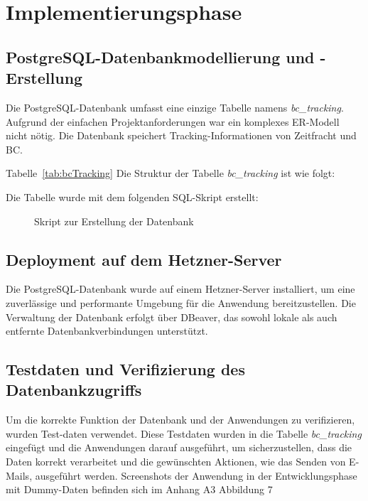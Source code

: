 \section{Implementierungsphase} 
\label{sec:Implementierungsphase}

\subsection{PostgreSQL-Datenbankmodellierung und -Erstellung}
\label{sec:Datenbankmodellierung}

Die PostgreSQL-Datenbank umfasst eine einzige Tabelle namens \textit{bc\_tracking}. 
Aufgrund der einfachen Projektanforderungen war ein komplexes ER-Modell nicht nötig. 
Die Datenbank speichert Tracking-Informationen von Zeitfracht und BC.

Tabelle~\ref{tab:bcTracking} Die Struktur der Tabelle \textit{bc\_tracking} ist wie folgt:
\\

\clearpage

Die Tabelle wurde mit dem folgenden SQL-Skript erstellt:

\begin{figure}[htb]
    \centering
    \caption{Skript zur Erstellung der Datenbank}
    \label{fig:DatenbankBCTracking}
\end{figure}



\subsection{Deployment auf dem Hetzner-Server}
\label{sec:Hetzner-Server}

Die PostgreSQL-Datenbank wurde auf einem Hetzner-Server installiert, um eine zuverlässige und performante 
Umgebung für die Anwendung bereitzustellen. Die Verwaltung der Datenbank erfolgt über DBeaver, das sowohl 
lokale als auch entfernte Datenbankverbindungen unterstützt.

\subsection{Testdaten und Verifizierung des Datenbankzugriffs}
\label{sec:VerifizierungTestdaten}

Um die korrekte Funktion der Datenbank und der Anwendungen zu verifizieren, wurden Test-daten verwendet. 
Diese Testdaten wurden in die Tabelle \textit{bc\_tracking} eingefügt und die Anwendungen darauf ausgeführt, 
um sicherzustellen, dass die Daten korrekt verarbeitet und die gewünschten Aktionen, wie das Senden von E-Mails, 
ausgeführt werden. Screenshots der Anwendung in der Entwicklungsphase mit Dummy-Daten befinden sich im Anhang A3 Abbildung 7

